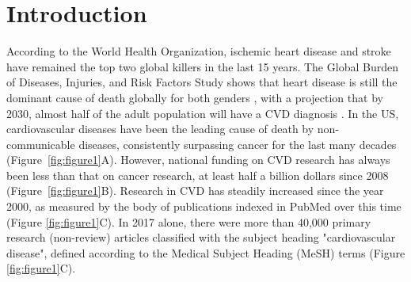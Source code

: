 \documentclass[letter]{bib}
\begin{document}
\maketitle
\section*{Introduction}
	
According to the World Health Organization, ischemic heart disease and stroke have remained the top two global killers in the last 15 years. The Global Burden of Diseases, Injuries, and Risk Factors Study shows that
heart disease is still the dominant cause of death globally for both genders \citep{Roth:2018:Global}, with a projection that by 2030, almost half of the adult population will have a CVD diagnosis \citep{Leopold:2018:Emerging,Heidenreich:2011:Forecasting}. In the US, cardiovascular diseases have been the leading cause of death by non-communicable diseases, consistently surpassing cancer for the last many decades (Figure~\ref{fig:figure1}A). However,  national funding on CVD research has always been less than that on cancer research, at least half a billion dollars since 2008 (Figure~\ref{fig:figure1}B). Research in CVD has steadily increased since the year 2000, as measured by the body of publications indexed in PubMed over this time (Figure \ref{fig:figure1}C).  In 2017 alone, there were more than 40,000 primary research (non-review) articles classified with the subject heading "cardiovascular disease", defined according to the Medical Subject Heading (MeSH) terms (Figure \ref{fig:figure1}C).   
\end{document}
